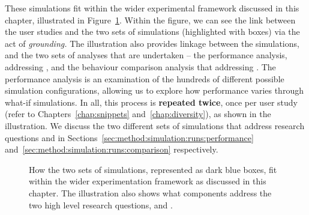 These simulations fit within the wider experimental framework discussed in this chapter, illustrated in Figure~\ref{fig:sim_evaluation}. Within the figure, we can see the link between the user studies and the two sets of simulations (highlighted with  boxes) via the act of \emph{grounding.} The illustration also provides linkage between the simulations, and the two sets of analyses that are undertaken -- the performance analysis, addressing , and the behaviour comparison analysis that addressing . The performance analysis is an examination of the hundreds of different possible simulation configurations, allowing us to explore how performance varies through what-if simulations. In all, this process is \textbf{\color{dmax_red} repeated twice}, once per user study (refer to Chapters~\ref{chap:snippets} and~\ref{chap:diversity}), as shown in the illustration. We discuss the two different sets of simulations that address research questions  and  in Sections~\ref{sec:method:simulation:runs:performance} and~\ref{sec:method:simulation:runs:comparison} respectively.

\begin{figure}[t!]
    \centering
    \caption[Empirical evaluation framework]{How the two sets of simulations, represented as dark blue boxes, fit within the wider experimentation framework as discussed in this chapter. The illustration also shows what components address the two high level research questions,  and .}
    \label{fig:sim_evaluation}
\end{figure}

